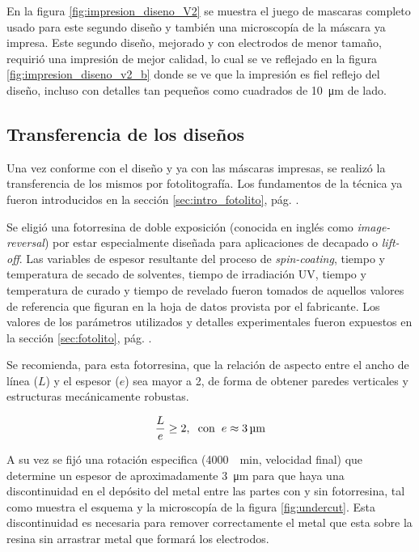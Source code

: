 {		     En la figura \ref{fig:impresion_diseno_V2} se muestra el juego de mascaras completo usado para este segundo diseño y también una microscopía de la máscara ya impresa. Este segundo diseño, mejorado y con electrodos de menor tamaño, requirió una impresión de mejor calidad, lo cual se ve reflejado en la figura \ref{fig:impresion_diseno_v2_b} donde se ve que la impresión es fiel reflejo del diseño, incluso con detalles tan pequeños como cuadrados de \SI{10}{\um} de lado. 
				
 		\subsection{Transferencia de los diseños}

 			 Una vez conforme con el diseño y ya con las máscaras impresas, se realizó la transferencia de los mismos por fotolitografía. Los fundamentos de la técnica ya fueron introducidos en la sección \ref{sec:intro_fotolito}, pág. \pageref{sec:intro_fotolito}.

 			 Se eligió una fotorresina de doble exposición (conocida en inglés como \textit{image-reversal}) por estar especialmente diseñada para aplicaciones de decapado o \textit{lift-off}. Las variables de espesor resultante del proceso de \textit{spin-coating}, tiempo y temperatura de secado de solventes, tiempo de irradiación UV, tiempo y temperatura de curado y tiempo de revelado fueron tomados de aquellos valores de referencia que figuran en la hoja de datos provista por el fabricante. \cite{TI35E} Los valores de los parámetros utilizados y detalles experimentales fueron expuestos en la sección \ref{sec:fotolito}, pág. \pageref{sec:fotolito}.

 			 Se recomienda, para esta fotorresina, que la relación de aspecto entre el ancho de línea ($L$) y el espesor ($e$) sea mayor a 2, de forma de obtener paredes verticales y estructuras mecánicamente robustas. 

 				\begin{equation}
				\frac{L}{e} \geq 2, \hspace*{0.2cm}\text{con}\hspace{0.2cm}  e \approx \SI{3}{\um}		
 				\end{equation}

     		 A su vez se fijó una rotación especifica (\SI{4000}{\per\minute}, velocidad final) que determine un espesor de aproximadamente \SI{3}{\um} para que haya una discontinuidad en el depósito del metal entre las partes con y sin fotorresina, tal como muestra el esquema y la microscopía de la figura \ref{fig:undercut}. Esta discontinuidad es necesaria para remover correctamente el metal que esta sobre la resina sin arrastrar metal que formará los electrodos. 

}
